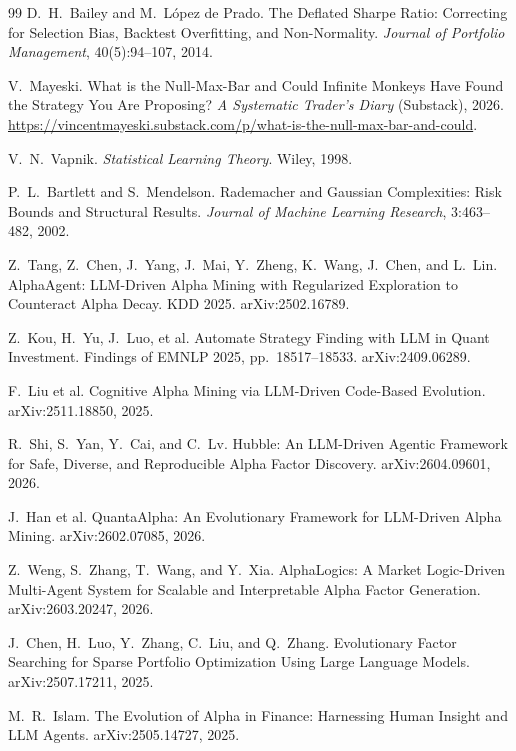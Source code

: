 \documentclass[11pt]{article}
\begin{document}
\begin{thebibliography}{99}
 D.~H.~Bailey and M.~L\'opez de Prado.
\newblock The Deflated Sharpe Ratio: Correcting for Selection Bias, Backtest Overfitting, and
Non-Normality.
\newblock \emph{Journal of Portfolio Management}, 40(5):94--107, 2014.

 V.~Mayeski.
\newblock What is the Null-Max-Bar and Could Infinite Monkeys Have Found the Strategy You Are Proposing?
\newblock \emph{A Systematic Trader's Diary} (Substack), 2026.
\newblock \url{https://vincentmayeski.substack.com/p/what-is-the-null-max-bar-and-could}.

 V.~N.~Vapnik. \emph{Statistical Learning Theory}. Wiley, 1998.

 P.~L.~Bartlett and S.~Mendelson.
\newblock Rademacher and Gaussian Complexities: Risk Bounds and Structural Results.
\newblock \emph{Journal of Machine Learning Research}, 3:463--482, 2002.

 Z.~Tang, Z.~Chen, J.~Yang, J.~Mai, Y.~Zheng, K.~Wang, J.~Chen, and L.~Lin.
\newblock AlphaAgent: LLM-Driven Alpha Mining with Regularized Exploration to Counteract Alpha Decay.
\newblock KDD 2025. arXiv:2502.16789.

 Z.~Kou, H.~Yu, J.~Luo, et al.
\newblock Automate Strategy Finding with LLM in Quant Investment.
\newblock Findings of EMNLP 2025, pp.~18517--18533. arXiv:2409.06289.

 F.~Liu et al.
\newblock Cognitive Alpha Mining via LLM-Driven Code-Based Evolution.
\newblock arXiv:2511.18850, 2025.

 R.~Shi, S.~Yan, Y.~Cai, and C.~Lv.
\newblock Hubble: An LLM-Driven Agentic Framework for Safe, Diverse, and Reproducible Alpha Factor
Discovery.
\newblock arXiv:2604.09601, 2026.

 J.~Han et al.
\newblock QuantaAlpha: An Evolutionary Framework for LLM-Driven Alpha Mining.
\newblock arXiv:2602.07085, 2026.

 Z.~Weng, S.~Zhang, T.~Wang, and Y.~Xia.
\newblock AlphaLogics: A Market Logic-Driven Multi-Agent System for Scalable and Interpretable Alpha
Factor Generation.
\newblock arXiv:2603.20247, 2026.

 J.~Chen, H.~Luo, Y.~Zhang, C.~Liu, and Q.~Zhang.
\newblock Evolutionary Factor Searching for Sparse Portfolio Optimization Using Large Language Models.
\newblock arXiv:2507.17211, 2025.

 M.~R.~Islam.
\newblock The Evolution of Alpha in Finance: Harnessing Human Insight and LLM Agents.
\newblock arXiv:2505.14727, 2025.


\end{thebibliography}
\end{document}
